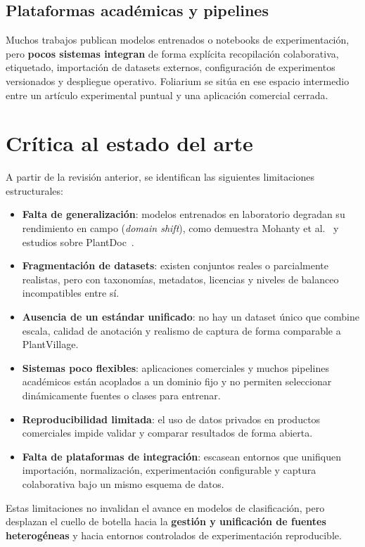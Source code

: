\documentclass[11pt,spanish,listoffigures,listoftables]{tfgetsinf}
\begin{document}
\subsection{Plataformas académicas y pipelines}

Muchos trabajos publican modelos entrenados o notebooks de experimentación, pero \textbf{pocos sistemas integran} de forma explícita recopilación colaborativa, etiquetado, importación de datasets externos, configuración de experimentos versionados y despliegue operativo. Foliarium se sitúa en ese espacio intermedio entre un artículo experimental puntual y una aplicación comercial cerrada.

\section{Crítica al estado del arte}

A partir de la revisión anterior, se identifican las siguientes limitaciones estructurales:

\begin{itemize}
    \item \textbf{Falta de generalización}: modelos entrenados en laboratorio degradan su rendimiento en campo (\textit{domain shift}), como demuestra Mohanty et al.~\cite{mohanty2016} y estudios sobre PlantDoc~\cite{plantdoc2020}.
    \item \textbf{Fragmentación de datasets}: existen conjuntos reales o parcialmente realistas, pero con taxonomías, metadatos, licencias y niveles de balanceo incompatibles entre sí.
    \item \textbf{Ausencia de un estándar unificado}: no hay un dataset único que combine escala, calidad de anotación y realismo de captura de forma comparable a PlantVillage.
    \item \textbf{Sistemas poco flexibles}: aplicaciones comerciales y muchos pipelines académicos están acoplados a un dominio fijo y no permiten seleccionar dinámicamente fuentes o clases para entrenar.
    \item \textbf{Reproducibilidad limitada}: el uso de datos privados en productos comerciales impide validar y comparar resultados de forma abierta.
    \item \textbf{Falta de plataformas de integración}: escasean entornos que unifiquen importación, normalización, experimentación configurable y captura colaborativa bajo un mismo esquema de datos.
\end{itemize}

Estas limitaciones no invalidan el avance en modelos de clasificación, pero desplazan el cuello de botella hacia la \textbf{gestión y unificación de fuentes heterogéneas} y hacia entornos controlados de experimentación reproducible.
\end{document}
